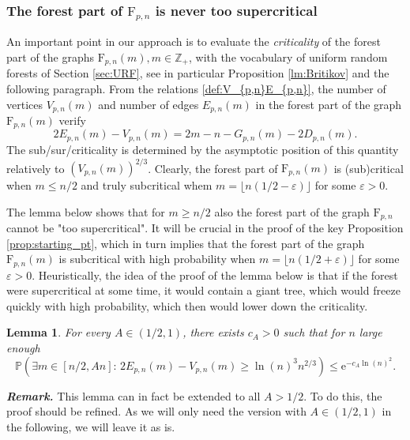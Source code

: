 \documentclass[a4, 11pt]{article}
\numberwithin{equation}{section}
\theoremstyle{plain}
\newtheorem{lemma}[theorem]{Lemma}
\theoremstyle{definition}
\theoremstyle{remark}
\begin{document}
	
\subsubsection{The forest part of $\mathrm{F}_{p,n}$ is never too supercritical}

An important point in our approach is to evaluate the \emph{criticality} of the forest part of the graphs $\mathrm F_{p,n}(m), m \in \mathbb Z_+$, with the vocabulary of uniform random forests of Section \ref{sec:URF}, see in particular Proposition \ref{lm:Britikov} and the following paragraph. From the relations \eqref{def:V_{p,n}E_{p,n}}, the number of vertices $V_{p,n}(m)$ and number of edges $E_{p,n}(m)$ in the forest part of the graph $\mathrm{F}_{p,n}(m)$ verify
\begin{equation}\label{eq:rel_E_V}
		2E_{p,n}(m)-V_{p,n}(m)=2m-n-G_{p,n}(m)-2D_{p,n}(m).
\end{equation}
The sub/sur/criticality is determined by the asymptotic position of this quantity relatively to \linebreak $(V_{p,n}(m))^{2/3}$.
Clearly, the forest part of $\mathrm{F}_{p,n}(m)$ is (sub)critical when $m \leq n/2$ and truly subcritical whem $m=\lfloor n(1/2-\varepsilon)\rfloor$ for some $\varepsilon>0$.
	
The lemma below shows that for $m\geq n/2$ also the forest part of the graph $\mathrm{F}_{p,n}$ cannot be "too supercritical".  It will be crucial in the proof of the key Proposition	\ref{prop:starting_pt}, which in turn implies that the forest part of the graph $\mathrm F_{p,n}(m)$ is subcritical with high probability when $m=\lfloor n(1/2+\varepsilon)\rfloor$ for some $\varepsilon>0$.
Heuristically, the idea of the proof of the lemma below is that if the forest were supercritical at some time, it would contain a giant tree, which would freeze quickly with high probability, which then would lower down the criticality. 


	\begin{lemma}\label{lm:supercrit}
		For every $A\in \left(1/2,1\right)$, there exists $c_{A}>0$ such that for  $n$ large enough
		$$\mathbb{P}\left(\exists m\in \left[n/2,An\right]:\, 2E_{p,n}(m)-V_{p,n}(m)\geq \ln(n)^3 n^{2/3}\right) \leq \mathrm{e}^{-c_A\ln(n)^2}.$$
	\end{lemma}
	
\textbf{\textit{Remark.}} This lemma can in fact be extended to all $A>1/2$. To do this, the proof should be refined. As we will only need the version with $A\in \left(1/2,1\right)$ in the following, we will leave it as is.	
	
\end{document}
